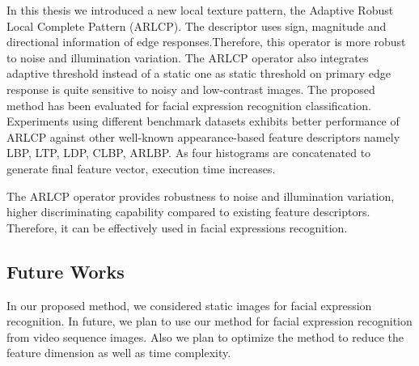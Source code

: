 \documentclass[12pt]{article}
\begin{document}
In this thesis we introduced a new local texture pattern, the Adaptive Robust Local Complete Pattern (ARLCP). The descriptor uses sign, magnitude and directional information of edge responses.Therefore, this operator is more robust to noise and illumination variation. The ARLCP operator also integrates adaptive threshold instead of a static one as static threshold on primary edge response is quite sensitive to noisy and low-contrast images. The proposed method has been evaluated for facial expression recognition classification. Experiments using different benchmark datasets exhibits better performance of ARLCP against other well-known appearance-based feature descriptors namely LBP, LTP, LDP, CLBP, ARLBP. As four histograms are concatenated to generate final feature vector, execution time increases. 

The ARLCP operator provides robustness to noise and illumination variation, higher discriminating capability compared to existing feature descriptors. Therefore, it can be effectively used in facial expressions recognition. 

\newpage	
\subsection{Future Works }				

In our proposed method, we considered static images for facial expression recognition. In future, we plan to use our method for facial expression recognition from video sequence images. Also we plan to optimize the method to reduce the feature dimension as well as time complexity.
\newpage
{}


\end{document}
